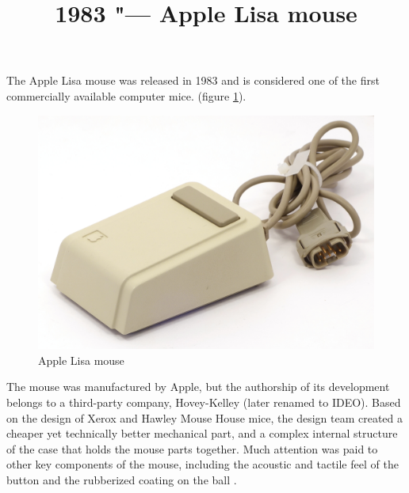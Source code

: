 \documentclass[11pt, a4paper]{article}
\begin{document}
\title{1983 "--- Apple Lisa mouse}
\date{}
\maketitle
{}
The Apple Lisa mouse was released in 1983 \cite{mouses} and is considered one of the first commercially available computer mice. (figure \ref{fig:AppleLisaPic}).

\begin{figure}[h]
   \centering
    \includegraphics[scale=0.5]{1983_apple_lisa_mouse/applenorm_30.jpg}
    \caption{Apple Lisa mouse}
    \label{fig:AppleLisaPic}
\end{figure}

The mouse was manufactured by Apple, but the authorship of its development belongs to a third-party company, Hovey-Kelley (later renamed to IDEO). Based on the design of Xerox and Hawley Mouse House mice, the design team created a cheaper yet technically better mechanical part, and a complex internal structure of the case that holds the mouse parts together. Much attention was paid to other key components of the mouse, including the acoustic and tactile feel of the button and the rubberized coating on the ball \cite{ideo}.
\end{document}

